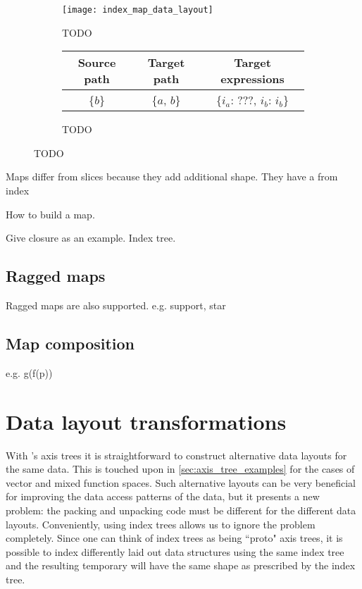 \documentclass[thesis]{subfiles}
\begin{document}
\begin{figure}[h]
  \centering
  \begin{subfigure}{\textwidth}
    \centering
    \texttt{[image: index\_map\_data\_layout]}
    \caption{
      TODO
    }
    \label{fig:index_map_data_layout}
  \end{subfigure}

  \vspace{1em}

  \begin{subfigure}{\textwidth}
    \centering
    \begin{tabular}{|c|c|c|}
      \hline
      \textbf{Source path} & \textbf{Target path} & \textbf{Target expressions} \\
      \hline
      \{$b$\} & \{$a$, $b$\} & \{$i_a$: ???, $i_b$: $i_b$\} \\
      \hline
    \end{tabular}
    \caption{
      TODO
    }
    \label{fig:index_map_data_layout_exprs}
  \end{subfigure}

  \caption{TODO}
  \label{fig:index_map_data_layout_all}
\end{figure}

Maps differ from slices because they add additional shape. They have a from index

How to build a map.

Give closure as an example. Index tree.

\subsection{Ragged maps}

Ragged maps are also supported. e.g. support, star

\subsection{Map composition}

e.g. g(f(p))

\section{Data layout transformations}

With 's axis trees it is straightforward to construct alternative data layouts for the same data.
This is touched upon in \cref{sec:axis_tree_examples} for the cases of vector and mixed function spaces.
Such alternative layouts can be very beneficial for improving the data access patterns of the data, but it presents a new problem: the packing and unpacking code must be different for the different data layouts.
Conveniently, using index trees allows us to ignore the problem completely.
Since one can think of index trees as being ``proto" axis trees, it is possible to index differently laid out data structures using the same index tree and the resulting temporary will have the same shape as prescribed by the index tree.
\end{document}
